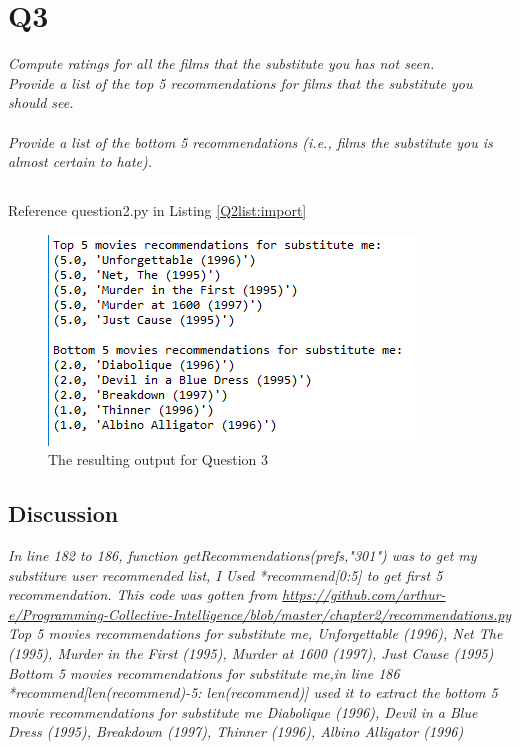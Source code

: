 \documentclass[12pt]{article}
\begin{document}
\section*{Q3}
\emph{Compute ratings for all the films that the substitute you has not seen.\\Provide a list of the top 5 recommendations for films that the substitute you should see. \\ \\Provide a list of the bottom 5 recommendations (i.e., films the substitute you is almost certain to hate).}
\subsection*{\color{blue}{Answer}}
Reference question2.py in Listing \ref{Q2list:import}
\begin{figure}[H]
            \centering
            \includegraphics[trim=0 0 0 0, clip, width=\textwidth] {answer3.PNG}
            \caption{ The resulting output for Question 3}
            \label{fig:1}
\end{figure}
\subsection*{Discussion}
\emph{In line 182 to 186, function getRecommendations(prefs,"301") was to get my substiture user recommended list, I Used *recommend[0:5] to get first 5 recommendation. This code was gotten from \url{https://github.com/arthur-e/Programming-Collective-Intelligence/blob/master/chapter2/recommendations.py}\\ 
Top 5 movies recommendations for substitute me, Unforgettable (1996), Net The (1995), Murder in the First (1995), Murder at 1600 (1997), Just Cause (1995)\\ 
Bottom 5 movies recommendations for substitute me,in line 186 *recommend[len(recommend)-5: len(recommend)] used it to extract the bottom 5 movie recommendations for substitute me Diabolique (1996), Devil in a Blue Dress (1995), Breakdown (1997), Thinner (1996), Albino Alligator (1996)}
\end{document}

